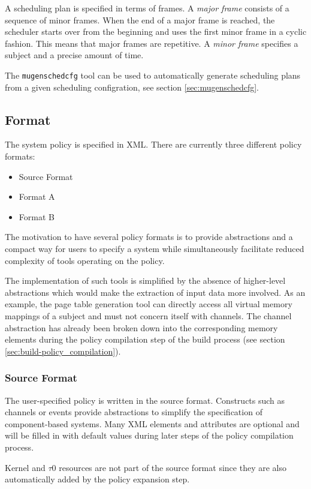 \documentclass[a4paper,twoside,titlepage]{article}
\begin{document}
A scheduling plan is specified in terms of frames. A \emph{major frame} consists
of a sequence of minor frames. When the end of a major frame is reached, the
scheduler starts over from the beginning and uses the first minor frame in a
cyclic fashion. This means that major frames are repetitive. A
\emph{minor frame} specifies a subject and a precise amount of time.

The \texttt{mugenschedcfg} tool can be used to automatically generate
scheduling plans from a given scheduling configration, see section
\ref{sec:mugenschedcfg}.

\subsection{Format}
The system policy is specified in XML. There are currently three different
policy formats:

\begin{itemize}
	\item Source Format
	\item Format A
	\item Format B
\end{itemize}

The motivation to have several policy formats is to provide abstractions and a
compact way for users to specify a system while simultaneously facilitate
reduced complexity of tools operating on the policy.

The implementation of such tools is simplified by the absence of higher-level
abstractions which would make the extraction of input data more involved. As
an example, the page table generation tool can directly access all virtual
memory mappings of a subject and must not concern itself with channels. The
channel abstraction has already been broken down into the corresponding memory
elements during the policy compilation step of the build process (see
section \ref{sec:build-policy_compilation}).

\subsubsection{Source Format}
The user-specified policy is written in the source format. Constructs such as
channels or events provide abstractions to simplify the specification of
component-based systems. Many XML elements and attributes are optional and will
be filled in with default values during later steps of the policy compilation
process.

Kernel and $\tau$0 resources are not part of the source format since they are also
automatically added by the policy expansion step.
\end{document}
